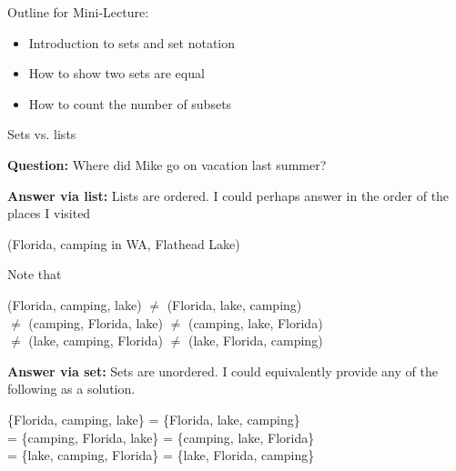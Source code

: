 \documentclass[10pt]{beamer}
\begin{document}
\begin{frame}[standout]
Outline for Mini-Lecture:
\begin{itemize}
\item \alert{\textbullet \quad Introduction to sets and set notation}
\item \textbullet \quad How to show two sets are equal
\item \textbullet \quad How to count the number of subsets
\end{itemize}
\end{frame}


\begin{frame}{Sets vs. lists}

\colorbox{yellow!30}{\textbf{Question:}} Where did Mike go on vacation last summer?

\vfill 
\pause 

\colorbox{green!30}{\textbf{Answer via list:}} Lists are \alert{ordered}.  I could perhaps answer in the order of the places I visited

\begin{center}
(Florida, camping in WA, Flathead Lake)	
\end{center}

\vfill
\pause 
Note that 

\begin{center}
\phantom{$\neq$} (Florida, camping, lake) $\neq$ (Florida, lake, camping) \\
 $\neq$ (camping, Florida, lake) $\neq$ (camping, lake, Florida) \\
  $\neq$ (lake, camping, Florida) $\neq$ (lake, Florida, camping) \\
\end{center}

\vfill 
\pause 
\colorbox{green!30}{\textbf{Answer via set:}} Sets are \alert{unordered}.   I could equivalently provide any of the following as a solution.

\begin{center}
\phantom{=} \{Florida, camping, lake\} =  \{Florida, lake, camping\} \\
 =  \{camping, Florida, lake\} = \{camping, lake, Florida\} \\
= \{lake, camping, Florida\} = \{lake, Florida, camping\} \\
\end{center}

	
\end{frame}
\end{document}
